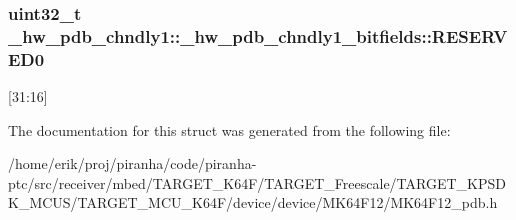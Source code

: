 \subsubsection[{\texorpdfstring{R\+E\+S\+E\+R\+V\+E\+D0}{RESERVED0}}]{\setlength{\rightskip}{0pt plus 5cm}uint32\+\_\+t \+\_\+hw\+\_\+pdb\+\_\+chndly1\+::\+\_\+hw\+\_\+pdb\+\_\+chndly1\+\_\+bitfields\+::\+R\+E\+S\+E\+R\+V\+E\+D0}\hypertarget{struct__hw__pdb__chndly1_1_1__hw__pdb__chndly1__bitfields_a9c75359bd0cd2d6e5b42dc5e70c61c50}{}\label{struct__hw__pdb__chndly1_1_1__hw__pdb__chndly1__bitfields_a9c75359bd0cd2d6e5b42dc5e70c61c50}
\mbox{[}31\+:16\mbox{]} 

The documentation for this struct was generated from the following file\+:\begin{DoxyCompactItemize}
\item 
/home/erik/proj/piranha/code/piranha-\/ptc/src/receiver/mbed/\+T\+A\+R\+G\+E\+T\+\_\+\+K64\+F/\+T\+A\+R\+G\+E\+T\+\_\+\+Freescale/\+T\+A\+R\+G\+E\+T\+\_\+\+K\+P\+S\+D\+K\+\_\+\+M\+C\+U\+S/\+T\+A\+R\+G\+E\+T\+\_\+\+M\+C\+U\+\_\+\+K64\+F/device/device/\+M\+K64\+F12/M\+K64\+F12\+\_\+pdb.\+h\end{DoxyCompactItemize}
